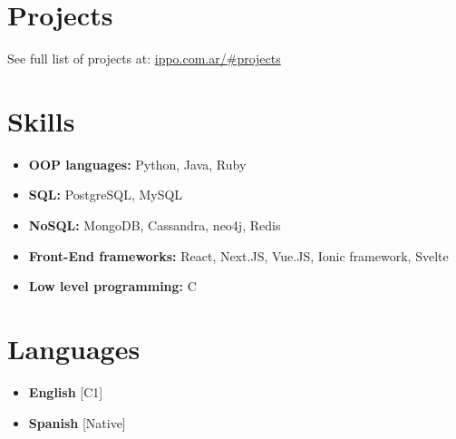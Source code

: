 \documentclass[11pt,a4paper,sans]{moderncv}
\begin{document}
\section{Projects}
See full list of projects at: {\color{blue} \href{https://www.ippo.com.ar/\#projects}{ippo.com.ar/\#projects}}


\section{Skills}
{\begin{itemize}[label=\textbullet]
\item {\textbf{OOP languages:} Python, Java, Ruby}
\item {\textbf{SQL:} PostgreSQL, MySQL}
\item {\textbf{NoSQL:} MongoDB, Cassandra, neo4j, Redis}
\item {\textbf{Front-End frameworks:} React, Next.JS, Vue.JS, Ionic framework, Svelte}
\item {\textbf{Low level programming:} C}
\end{itemize}}

\section{Languages}
\begin{multicols}{2}
    \begin{itemize}[label=\textbullet]
    \item \textbf{English} [C1]
    \item {\textbf{Spanish} [Native]}

    \end{itemize}
\end{multicols}
\end{document}
